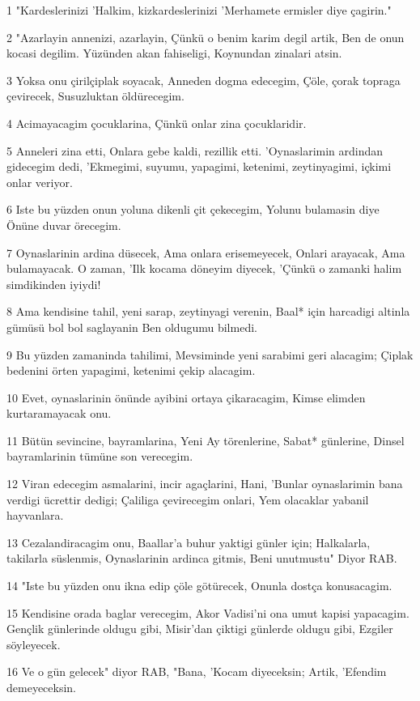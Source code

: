 \par 1 "Kardeslerinizi 'Halkim, kizkardeslerinizi 'Merhamete ermisler diye çagirin."
\par 2 "Azarlayin annenizi, azarlayin, Çünkü o benim karim degil artik, Ben de onun kocasi degilim. Yüzünden akan fahiseligi, Koynundan zinalari atsin.
\par 3 Yoksa onu çirilçiplak soyacak, Anneden dogma edecegim, Çöle, çorak topraga çevirecek, Susuzluktan öldürecegim.
\par 4 Acimayacagim çocuklarina, Çünkü onlar zina çocuklaridir.
\par 5 Anneleri zina etti, Onlara gebe kaldi, rezillik etti. 'Oynaslarimin ardindan gidecegim dedi, 'Ekmegimi, suyumu, yapagimi, ketenimi, zeytinyagimi, içkimi onlar veriyor.
\par 6 Iste bu yüzden onun yoluna dikenli çit çekecegim, Yolunu bulamasin diye Önüne duvar örecegim.
\par 7 Oynaslarinin ardina düsecek, Ama onlara erisemeyecek, Onlari arayacak, Ama bulamayacak. O zaman, 'Ilk kocama döneyim diyecek, 'Çünkü o zamanki halim simdikinden iyiydi!
\par 8 Ama kendisine tahil, yeni sarap, zeytinyagi verenin, Baal* için harcadigi altinla gümüsü bol bol saglayanin Ben oldugumu bilmedi.
\par 9 Bu yüzden zamaninda tahilimi, Mevsiminde yeni sarabimi geri alacagim; Çiplak bedenini örten yapagimi, ketenimi çekip alacagim.
\par 10 Evet, oynaslarinin önünde ayibini ortaya çikaracagim, Kimse elimden kurtaramayacak onu.
\par 11 Bütün sevincine, bayramlarina, Yeni Ay törenlerine, Sabat* günlerine, Dinsel bayramlarinin tümüne son verecegim.
\par 12 Viran edecegim asmalarini, incir agaçlarini, Hani, 'Bunlar oynaslarimin bana verdigi ücrettir dedigi; Çaliliga çevirecegim onlari, Yem olacaklar yabanil hayvanlara.
\par 13 Cezalandiracagim onu, Baallar'a buhur yaktigi günler için; Halkalarla, takilarla süslenmis, Oynaslarinin ardinca gitmis, Beni unutmustu" Diyor RAB.
\par 14 "Iste bu yüzden onu ikna edip çöle götürecek, Onunla dostça konusacagim.
\par 15 Kendisine orada baglar verecegim, Akor Vadisi'ni ona umut kapisi yapacagim. Gençlik günlerinde oldugu gibi, Misir'dan çiktigi günlerde oldugu gibi, Ezgiler söyleyecek.
\par 16 Ve o gün gelecek" diyor RAB, "Bana, 'Kocam diyeceksin; Artik, 'Efendim demeyeceksin.
